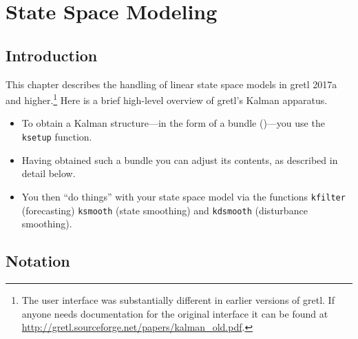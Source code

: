 \newcommand{\obsvec}{y}
\newcommand{\obsymat}{Z}
\newcommand{\obsx}{x}
\newcommand{\obsxmat}{B}
\newcommand{\obsdist}{u}
\newcommand{\obsvar}{R}

\newcommand{\statevec}{\alpha}
\newcommand{\statecvar}{P}
\newcommand{\statemat}{T}
\newcommand{\strdist}{w}
\newcommand{\statevar}{Q}
\newcommand{\gain}{K}
\newcommand{\statemu}{\mu}

\newcommand{\altstatevar}{H}
\newcommand{\altobsvar}{G}
\newcommand{\alldist}{\varepsilon}

\newcommand{\prederr}{v}
\newcommand{\predvar}{F}

\newcommand{\myvec}{\mbox{vec}}
\newcommand{\myvech}{\mbox{vech}}

\chapter{State Space Modeling}
\label{chap:kalman}

\section{Introduction}
\label{sec:amble}

This chapter describes the handling of linear state space models in
gretl 2017a and higher.\footnote{The user interface was substantially
  different in earlier versions of gretl. If anyone needs
  documentation for the original interface it can be found at
  \url{http://gretl.sourceforge.net/papers/kalman_old.pdf}.}
Here is a brief high-level overview of gretl's Kalman apparatus.
%
\begin{itemize}
\item To obtain a Kalman structure---in the form of a bundle ()---you
  use the \texttt{ksetup} function.
\item Having obtained such a bundle you can adjust its contents, as
  described in detail below.
\item You then ``do things'' with your state space model via the
  functions \texttt{kfilter} (forecasting) \texttt{ksmooth} (state
  smoothing) and \texttt{kdsmooth} (disturbance smoothing).
\end{itemize}

\section{Notation}

